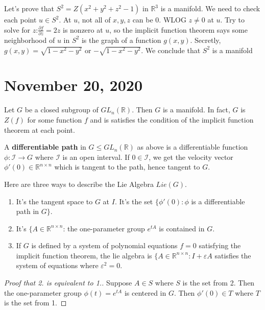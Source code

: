 \documentclass{article}
\newcommand{\vocab}[1]{\textbf{\color{blue!90}\boldmath #1}}
\newcommand{\R}{\mathbb{R}}
\newcommand{\eps}{\varepsilon}
\newcommand{\ra}[1][]{\xrightarrow{#1}}
\begin{document}
\begin{example}
Let's prove that $S^2=Z(x^2+y^2+z^2-1)$ in $\R^3$ is a manifold. We need to check each point $u\in S^2$. At $u$, not all of $x,y,z$ can be 0. WLOG $z\neq 0$ at $u$. Try to solve for $z$:$\frac{\partial f}{\partial z}=2z$ is nonzero at $u$, so the implicit function theorem says some neighborhood of $u$ in $S^2$ is the graph of a function $g(x,y)$. Secretly, $g(x,y)=\sqrt{1-x^2-y^2}$ or $-\sqrt{1-x^2-y^2}$. We conclude that $S^2$ is a manifold
\end{example}
\section{November 20, 2020}
\begin{theorem}
Let $G$ be a closed subgroup of $GL_n(\R)$. Then $G$ is a manifold. In fact, $G$ is $Z(f)$ for some function $f$ and is satisfies the condition of the implicit function theorem at each point. 
\end{theorem}
\begin{definition}
A \vocab{differentiable path} in $G\leq GL_n(\R)$ as above is a differentiable function $\phi: \mathcal I\ra G$ where $\mathcal I$ is an open interval. If $0\in \mathcal I$, we get the velocity vector $\phi'(0)\in\R^{n\times n}$ which is tangent to the path, hence tangent to $G$.
\end{definition}
\begin{definition}
Here are three ways to describe the Lie Algebra $Lie(G)$.
\begin{enumerate}
    \item It's the tangent space to $G$ at $I$. It's the set $\{\phi'(0):\phi$ is a differentiable path in $G\}$. 
    \item It's $\{A\in\R^{n\times n}$: the one-parameter group $e^{tA}$ is contained in $G$. 
    \item If $G$ is defined by a system of polynomial equations $f=0$ satisfying the implicit function theorem, the lie algebra is $\{A\in\R^{n\times n}:I+\eps A$ satisfies the system of equations where $\eps^2=0$.
\end{enumerate}
\end{definition}
\begin{proof}[Proof that 2. is equivalent to 1.]
Suppose $A\in S$ where $S$ is the set from 2. Then the one-parameter group $\phi(t)=e^{tA}$ is centered in $G$. Then $\phi'(0)\in T$ where $T$ is the set from 1.
\end{proof}
\end{document}
